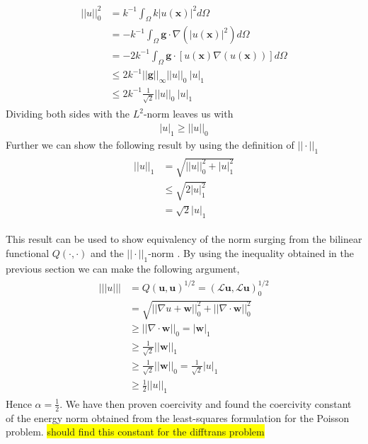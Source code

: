 \begin{align}
	\begin{split}
	||u||_0^2 &= k^{-1}\int_{\Omega}k|u(\mathbf{x})|^2d\Omega \\
	&= -k^{-1}\int_{\Omega}\mathbf{g}\cdot \nabla(|u(\mathbf{x})|^2)d\Omega \\
	&= -2k^{-1}\int_{\Omega}\mathbf{g}\cdot [u(\mathbf{x})\nabla(u(\mathbf{x}))]d\Omega \\
	&\leq 2k^{-1}||\mathbf{g}||_{\infty}||u||_0 \: |u|_1\\
	&\leq 2k^{-1}\frac{1}{\sqrt{2}}||u||_0 \: |u|_1
	\end{split}
	\label{eq:PoincareProof}
\end{align}
Dividing both sides with the $L^2$-norm leaves us with
\begin{align}
	|u|_1 \geq ||u||_0
	\label{eq:PoincareStatement}
\end{align}
Further we can show the following result by using the definition of $||\cdot||_1$
\begin{align}
	\begin{split}
	||u||_1 &= \sqrt{||u||_0^2+|u|_1^2}\\
	&	\leq \sqrt{2|u|_1^2}\\
	&= \sqrt{2}|u|_1
	\end{split}
	\label{eq:NormInequalitySobolev}
\end{align}

This result can be used to show equivalency of the norm surging from the bilinear functional $Q(\cdot,\cdot)$ and the $|| \cdot ||_1$-norm . 
By using the inequality obtained in the previous section we can make the following argument,
\begin{align}
	\begin{split}
	|||u||| 
	&=Q(\mathbf{u},\mathbf{u})^{1/2} 
	= (\mathcal{L}\mathbf{u},\mathcal{L}\mathbf{u})_0^{1/2} \\
	&= \sqrt{||\nabla u+\mathbf{w}||^2_0+||\nabla \cdot \mathbf{w}||^2_0}\\
	&\geq ||\nabla \cdot \mathbf{w}||_0
	= |\mathbf{w}|_1 \\
	&\geq \frac{1}{\sqrt{2}}||\mathbf{w}||_1\\
	&\geq \frac{1}{\sqrt{2}}||\mathbf{w}||_0
	= \frac{1}{\sqrt{2}}|u|_1\\
	&\geq \frac{1}{2}||u||_1
	\end{split}
	\label{eq:resultAlpha}
\end{align}
Hence $\alpha=\frac{1}{2}$. We have then proven coercivity and found the coercivity constant of the energy norm obtained from the least-squares formulation for the Poisson problem.  
\colorbox{yellow}{should find this constant for the difftrans problem}
%
